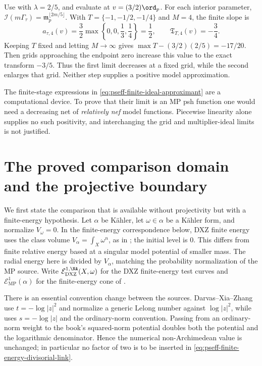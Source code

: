 \begin{example}
\label{ex:pseff-finite-ideal-grid}
Use  with $\lambda=2/5$, and evaluate at
$v=(3/2)\ord_p$. For each interior parameter,
$\mathcal I(m\Gamma_\tau)=\mathfrak m_p^{\lfloor2m/5\rfloor}$.
With $T=\{-1,-1/2,-1/4\}$ and $M=4$, the finite slope is
\[
 a_{\tau,4}(v)=\frac32
     \max\left\{0,0,\frac13,\frac14\right\}=\frac12,
 \qquad \mathfrak T_{T,4}(v)=-\frac34.
\]
Keeping $T$ fixed and letting $M\to\infty$ gives
$\max T-(3/2)(2/5)=-17/20$. Then grids approaching the endpoint zero
increase this value to the exact transform $-3/5$.
Thus the first limit decreases at a fixed grid, while the second enlarges
that grid. Neither step supplies a positive model approximation.
\end{example}

\begin{remark}\label{rem:pseff-pl-limit-firewall}
The finite-stage expressions in \eqref{eq:pseff-finite-ideal-approximant}
are a
computational device.  To prove that their limit is an MP psh function
one would need a decreasing net of \emph{relatively nef} model
functions.  Piecewise linearity alone supplies no such positivity, and
interchanging the grid and multiplier-ideal limits is not justified.
\end{remark}

\section{The proved comparison domain and the projective boundary}
\label{sec:pseff-comparison}

We first state the comparison that is available without projectivity but
with a finite-energy hypothesis.  Let $\alpha$ be K\"ahler, let
$\omega\in\alpha$ be a K\"ahler form, and normalize
$V_\omega=0$. In the finite-energy correspondence below, DXZ finite
energy uses the class volume $V_\alpha=\int_X\omega^n$, as in
\cite[formula~(43), Section~3.4]{DXZ23}; the initial level is $0$.
This differs from finite relative energy based at a singular model
potential of smaller mass. The radial energy here is divided by
$V_\alpha$, matching the probability normalization of the MP source.
Write
$\mathcal E^{1,\NA}_{\mathrm{DXZ}}(X,\omega)$ for the DXZ
finite-energy test curves and $\mathcal E^1_{\mathrm{MP}}(\alpha)$ for
the finite-energy cone of .

There is an essential convention change between the sources.
Darvas--Xia--Zhang use $t=-\log|z|^2$ and normalize a generic Lelong
number against $\log|z|^2$, while \cite{MP24} uses
$s=-\log|z|$ and the ordinary-norm convention.  Passing from an
ordinary-norm weight to the book's squared-norm potential doubles both the
potential and the logarithmic denominator.  Hence the numerical
non-Archimedean value is unchanged; in particular no factor of two is to be
inserted in \eqref{eq:pseff-finite-energy-divisorial-link}.

